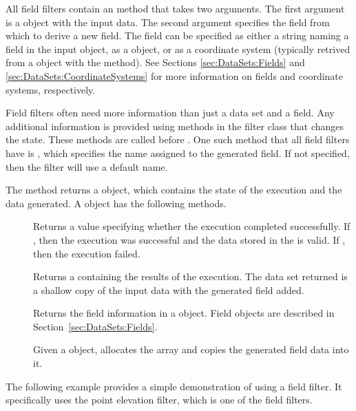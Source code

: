 All field filters contain an  method that takes two
arguments. The first argument is a  object with the input
data. The second argument specifies the field from which to derive a new
field. The field can be specified as either a string naming a field in the
input  object, as a  object, or as
a coordinate system (typically retrived from a 
object with the  method). See Sections
\ref{sec:DataSets:Fields} and \ref{sec:DataSets:CoordinateSystems} for more
information on fields and coordinate systems, respectively.

Field filters often need more information than just a data set and a field.
Any additional information is provided using methods in the filter class
that changes the state. These methods are called before .
One such method that all field filters have is
, which specifies the name assigned to the
generated field. If not specified, then the filter will use a default name.

The  method returns a  object,
which contains the state of the execution and the data generated. A
 object has the following methods.

\begin{description}
\item[] Returns a  value specifying
  whether the execution completed successfully. If , then
  the execution was successful and the data stored in the
   is valid. If , then the
  execution failed.
\item[] Returns a  containing
  the results of the execution. The data set returned is a shallow copy of
  the input data with the generated field added.
\item[] Returns the field information in a
   object. Field objects are described in
  Section~\ref{sec:DataSets:Fields}.
\item[] Given a  object, allocates
  the array and copies the generated field data into it.
\end{description}

The following example provides a simple demonstration of using a field
filter. It specifically uses the point elevation filter, which is one of
the field filters.

